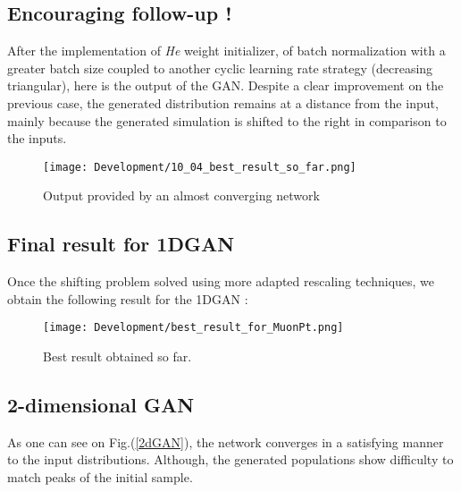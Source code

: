 \subsection{Encouraging follow-up !}

After the implementation of \textit{He} weight initializer, of batch normalization with a greater batch size coupled to another cyclic learning rate strategy (decreasing triangular), here is the output of the GAN.
Despite a clear improvement on the previous case, the generated distribution remains at a distance from the input, mainly because the generated simulation is shifted to the right in comparison to the inputs.

\begin{figure}[H]
    \centering
    \texttt{[image: Development/10\_04\_best\_result\_so\_far.png]}
    \caption{Output provided by an almost converging network}
    \label{fig:enter-label}
\end{figure}

\subsection{Final result for 1DGAN}

Once the shifting problem solved using more adapted rescaling techniques, we obtain the following result for the 1DGAN :

\begin{figure}[H]
    \centering
    \texttt{[image: Development/best\_result\_for\_MuonPt.png]}
    \caption{Best result obtained so far.}
    \label{fig:enter-label}
\end{figure}


\subsection{2-dimensional GAN}

As one can see on Fig.(\ref{2dGAN}), the network converges in a satisfying manner to the input distributions. Although, the generated populations show difficulty to match peaks of the initial sample.

